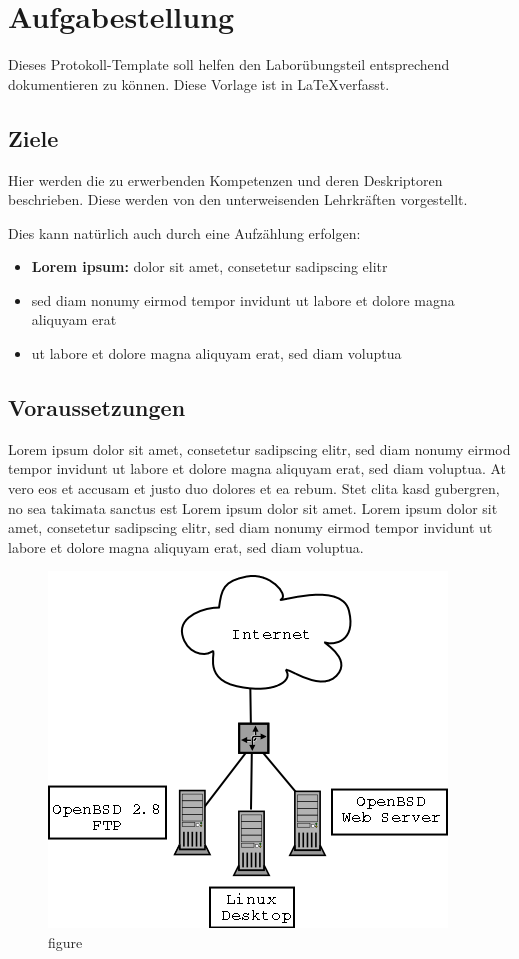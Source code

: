 
\section{Aufgabestellung}
Dieses Protokoll-Template soll helfen den Laborübungsteil entsprechend dokumentieren zu können.
Diese Vorlage ist in \LaTeX  verfasst.

\subsection{Ziele}
Hier werden die zu erwerbenden Kompetenzen und deren Deskriptoren beschrieben.
Diese werden von den unterweisenden Lehrkräften vorgestellt.

Dies kann natürlich auch durch eine Aufzählung erfolgen:

\begin{itemize}
	\item \textbf{Lorem ipsum:} dolor sit amet, consetetur sadipscing elitr
	\item sed diam nonumy eirmod tempor invidunt ut labore et dolore magna aliquyam erat
	\item ut labore et dolore magna aliquyam erat, sed diam voluptua
\end{itemize}


\subsection{Voraussetzungen}
Lorem ipsum dolor sit amet, consetetur sadipscing elitr, sed diam nonumy eirmod tempor invidunt ut labore et dolore magna aliquyam erat, sed diam voluptua.
At vero eos et accusam et justo duo dolores et ea rebum. Stet clita kasd gubergren, no sea takimata sanctus est Lorem ipsum dolor sit amet.
Lorem ipsum dolor sit amet, consetetur sadipscing elitr, sed diam nonumy eirmod tempor invidunt ut labore et dolore magna aliquyam erat, sed diam voluptua.

\begin{figure}[!h]
	\begin{center}
		\includegraphics[width=0.5\linewidth]{images/home_network.png}
		\caption{figure \cite{example}}
		\label{broker}
	\end{center}
\end{figure}

